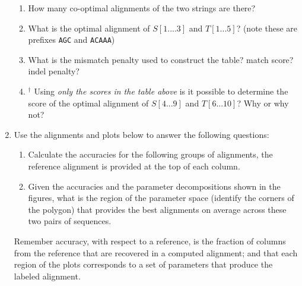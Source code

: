 \documentclass[11pt, oneside]{article}   	%
\begin{document}
\begin{enumerate}
\begin{center}
{\begin{tabular}{|c||c|c|c|c|c|c|c|c|c|c|c|c|}
\hline 
\end{tabular}
}
\end{center}
\begin{enumerate}
\item How many co-optimal alignments of the two strings are there? 
\item What is the optimal alignment of $S[1....3]$ and $T[1...5]$? (note these are prefixes \texttt{AGC} and \texttt{ACAAA})
\item What is the mismatch penalty used to construct the table? match score? indel penalty? 
\item$^\dag$ Using \textit{only the scores in the table above} is it possible to determine the score of the optimal alignment of $S[4...9]$ and $T[6...10]$? Why or why not?
\end{enumerate}


\clearpage
\item 
Use the alignments and plots below to answer the following questions:
\begin{enumerate}
\item Calculate the accuracies for the following groups of alignments, 
the reference alignment is provided at the top of each column. 
\item Given the accuracies and the parameter decompositions shown in the figures, 
what is the region of the parameter space (identify the corners of the polygon) 
that provides the best alignments on average across these two pairs of sequences. 
\end{enumerate}
Remember accuracy, with respect to a reference, is the fraction of columns from the reference that are recovered in a computed alignment; 
and that each region of the plots corresponds to a set of parameters that produce the labeled alignment.


\end{enumerate}
\end{document}

